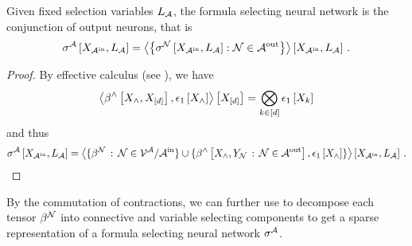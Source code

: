 \begin{theorem}
    Given fixed selection variables $L_{\mathcal{A}}$, the formula selecting neural network is the conjunction of output neurons, that is
    \begin{align*}
        \fsnnat{\catvariableof{\inneuronset},\selvariableof{\larchitecture}} %
        = \contractionof{\left\{\lneuractivationat{\catvariableof{\inneuronset},\selvariableof{\larchitecture}} : \lneuron\in\outneuronset\right\}}{\catvariableof{\inneuronset},\selvariableof{\larchitecture}} \, .
    \end{align*}
\end{theorem}
\begin{proof}
    By effective calculus (see ), we have
    \[ \left\langle \beta^{\land}\left[X_{\land},X_{[d]}\right],\epsilon_{1}\left[X_{\land}\right]\right\rangle \left[ X_{[d]} \right] = \bigotimes_{k\in[d]} \epsilon_{1}\left[X_{k}\right] \]
    and thus
    \begin{align*}
        \sigma^{\mathcal{A}}\left[X_{\mathcal{A}^{\mathrm{in}}},L_{\mathcal{A}}\right]
        = \left\langle 
            \{\beta^{\mathcal{N}} \, : \, \mathcal{N}\in\mathcal{V}^{\mathcal{A}}/\mathcal{A}^{\mathrm{in}} \} \cup \{\beta^{\land}\left[X_{\land},Y_{\mathcal{N}}  \, : \, \mathcal{N}\in\mathcal{A}^{\mathrm{out}}\right], \epsilon_{1}\left[X_{\land}\right]\}
        \right\rangle \left[ X_{\mathcal{A}^{\mathrm{in}}},L_{\mathcal{A}} \right] \, .
    \end{align*}
\end{proof}


By the commutation of contractions, we can further use  to decompose each tensor $\beta^{\mathcal{N}}$ into connective and variable selecting components to get a sparse representation of a formula selecting neural network $\sigma^{\mathcal{A}}$.


